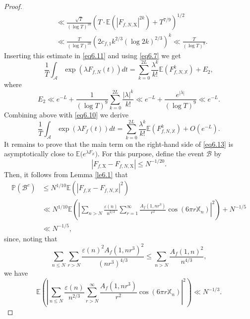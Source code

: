 \documentclass[10pt,leqno]{amsart}
\numberwithin{equation}{section}
\begin{document}
\begin{proof}
\[\begin{aligned}
& \ll \frac{\sqrt{T}}{(\log T)^{10}}\left(T \cdot \mathbb{E}\left(\left|F_{f,N, \mathrm{X}}\right|^{2 k}\right)+T^{7 / 9}\right)^{1 / 2} \\
& \ll \frac{T}{(\log T)^{10}}\left(2 c_{f,1} k^{2 / 3}\left(\log 2k\right)^{2/3}\right)^k \ll \frac{T}{(\log T)^9} .
\end{aligned}
\]
Inserting this estimate in \eqref{eq6.11} and using  \eqref{eq6.7} we get
\begin{equation}\label{eq6.12}
    \frac{1}{T} \int_{\mathcal{A}} \exp \left(\lambda F_{f,N}(t)\right) d t=\sum_{k=0}^{2 L} \frac{\lambda^k}{k!} \mathbb{E}\left(F_{f,N, \mathbb{X}}^k\right)+E_2,
\end{equation}
where
\[
E_2 \ll e^{-L}+\frac{1}{(\log T)^9} \sum_{k=0}^{2 L} \frac{|\lambda|^k}{k!} \ll e^{-L}+\frac{e^{|\lambda|}}{(\log T)^9} \ll e^{-L} .
\]
Combining above with \eqref{eq6.10} we derive
\begin{equation}\label{eq6.13}
    \frac{1}{T} \int_{\mathcal{A}} \exp (\lambda F_f(t)) d t=\sum_{k=0}^{2 L} \frac{\lambda^k}{k!} \mathbb{E}\left(F_{f,N, \mathbb{X}}^k\right)+O\left(e^{-L}\right).
\end{equation}
It remains to prove that the main term on the right‑hand side of \eqref{eq6.13} is asymptotically close to $\mathbb{E}\bigl(e^{\lambda F_{\mathbb{X}}}\bigr)$. For this purpose, define the event $\mathcal{B}$ by
\[
\left|F_{f,\mathrm{X}}-F_{f,N, \mathrm{X}}\right| \leqslant N^{-1 / 20} .
\]
Then, it follows from Lemma \ref{le6.1} that
\begin{equation}\label{eq6.14}
    \begin{aligned}
\mathbb{P}\left(\mathcal{B}^c\right) & \leqslant N^{1 / 10} \mathbb{E}\left(\left|F_{f,\mathbb{X}}-F_{f,N, \mathbb{X}}\right|^2\right) \\
& \ll N^{1 / 10} \mathbb{E}\left(\left|\sum_{n>N} \frac{\varepsilon(n)}{n^{2/3}} \sum_{r=1}^{\infty} \frac{A_f\left(1,n r^3\right)}{r^{2}} \cos \left(6 \pi r \mathbb{X}_n\right)\right|^2\right)+N^{-1 /5} \\
& \ll N^{-1 / 5},
\end{aligned}
\end{equation}
since, noting that
\[
\sum_{n\leqslant N} \sum_{r> N}\frac{\varepsilon(n)^2A_f(1,nr^3)^2}{\left(nr^3\right)^{4/3}}\leqslant \sum_{n>N}\frac{A_f(1,n)^2}{n^{4/3}}, 
\]
we have
\[
 \mathbb{E}\left(\left|\sum_{n\leqslant N} \frac{\varepsilon(n)}{n^{2/3}} \sum_{r>N}^{\infty} \frac{A_f\left(1,n r^3\right)}{r^{2}} \cos \left(6 \pi r \mathbb{X}_n\right)\right|^2\right)
 \ll N^{-1 /3} .
\]


\end{proof}
\end{document}
